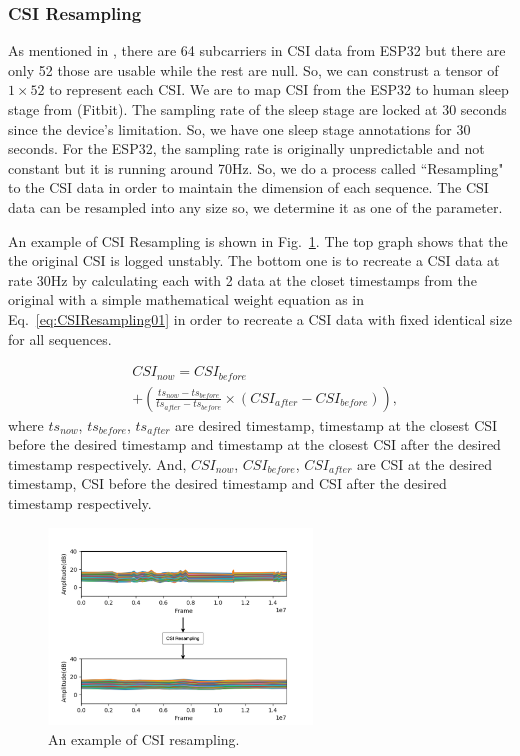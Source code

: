 \documentclass[10pt,letterpaper]{article}
\begin{document}
	\subsubsection*{CSI Resampling}
	
	As mentioned in , there are 64 subcarriers in CSI data from ESP32 but there are only 52 those are usable while the rest are null. So, we can construst a tensor of $1 \times 52$ to represent each CSI. We are to map CSI from the ESP32 to human sleep stage from {(Fitbit)}. The sampling rate of the sleep stage are locked at 30 seconds 
	since the device's limitation. So, we have one sleep stage annotations for 30 seconds. For the ESP32, the sampling rate is originally unpredictable and not constant but it is running around 70Hz. So, we do a process called ``Resampling" to the CSI data in order to maintain the dimension of each sequence. The CSI data can be resampled into any size so, we determine it as one of the parameter.
	
	An example of CSI Resampling is shown in Fig.~\ref{fig:CSIResampling01}. The top graph shows that the the original CSI is logged unstably. The bottom one is to recreate a CSI data at rate 30Hz by calculating each with 2 data at the closet timestamps from the original with a simple mathematical weight equation as in Eq.~\ref{eq:CSIResampling01} in order to recreate a CSI data with fixed identical size for all sequences.
	
	\begin{equation}
		\begin{aligned}
			& CSI_{now} = CSI_{before} \\ 
			& + \left(  \frac{ts_{now}-ts_{before}}{ts_{after}-ts_{before}}  \times (CSI_{after}-CSI_{before})   \right),
			\label{eq:CSIResampling01}
		\end{aligned}
	\end{equation}
	where $ts_{now}$, $ts_{before}$, $ts_{after}$ are desired timestamp, timestamp at the closest CSI before the desired timestamp and timestamp at the closest CSI after the desired timestamp respectively. And, $CSI_{now}$, $CSI_{before}$, $CSI_{after}$ are CSI at the desired timestamp, CSI before the desired timestamp and CSI after the desired timestamp respectively.
	
	\begin{figure}[htbp]
		\centerline{\includegraphics[width=70mm,scale=0.5]{CSIResampling03.png}}
		\caption{An example of CSI resampling.}
		\label{fig:CSIResampling01}
	\end{figure}
	
\end{document}
